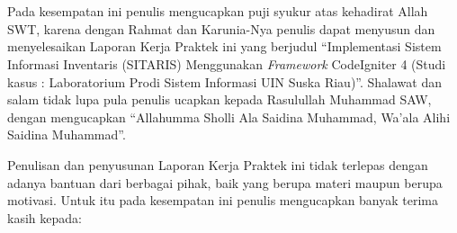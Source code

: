 %



\chapter*{\kataPengantar}
Pada kesempatan ini penulis mengucapkan puji syukur atas kehadirat Allah SWT, karena dengan Rahmat dan Karunia-Nya penulis dapat menyusun dan menyelesaikan Laporan Kerja Praktek ini yang berjudul “Implementasi Sistem Informasi Inventaris (SITARIS) Menggunakan \textit{Framework} CodeIgniter 4 (Studi kasus : Laboratorium Prodi Sistem Informasi UIN Suska Riau)”. Shalawat dan salam tidak lupa pula penulis ucapkan kepada Rasulullah Muhammad SAW, dengan mengucapkan “Allahumma Sholli Ala Saidina Muhammad, Wa’ala Alihi Saidina Muhammad”. 

Penulisan dan penyusunan Laporan Kerja Praktek ini tidak terlepas dengan adanya bantuan dari berbagai pihak, baik yang berupa materi maupun berupa motivasi. Untuk itu pada kesempatan ini penulis mengucapkan banyak terima kasih kepada: 

